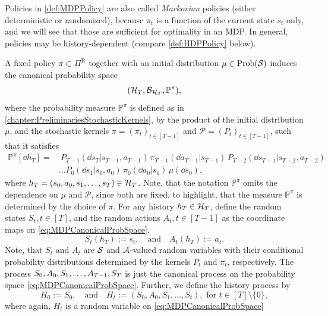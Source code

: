 \documentclass[
    a4paper,
    11pt,
    bibliography=totoc,
    listof=totoc,      
    headinclude=true,
    cleardoublepage=empty,
]{scrbook}
\theoremstyle{plain}
\theoremstyle{definition}
\theoremstyle{remark}
\newcommand{\PM}{\mathbb P}
\newcommand{\SpaceS}{{\cal S}}
\newcommand{\SpaceA}{{\cal A}}
\newcommand{\SpaceH}{{\cal H}}
\begin{document}
Policies in \cref{def:MDPPolicy} are also called \textit{Markovian}
policies (either deterministic or randomized), because $\pi_t$ is a function
of the current state $s_t$ only, and we will see that those are sufficient for 
optimality in an MDP. In general, policies may be history-dependent (compare  
\cref{def:HDPPolicy} below).

A fixed policy $\pi\subset \Pi^\text{R}$ together with an initial distribution
$\mu\in\text{Prob}(\SpaceS)$ induces the canonical probability space
\begin{equation}
\label{eq:MDPCanonicalProbSpace}
    (\SpaceH_T, \mathcal{B}_{\SpaceH_T}, \PM^\pi),
\end{equation}
where the probability measure $\PM^\pi$ is defined as in
\cref{chapter:PreliminariesStochasticKernels}, by the product of the initial 
distribution $\mu$, and the stochastic kernels $\pi = (\pi_t)_{t\in[T-1]}$  and 
$\mathcal{P} = (P_t)_{t\in[T-1]}$, such that it satisfies
\begin{equation}
\label{eq:MDPCanonicalMeasure}
\begin{split}
    \PM^\pi [\dd{h_T}] 
    = &\ P_{T-1}(\dd s_T | s_{T-1}, a_{T-1})\, \pi_{T-1}(\dd a_{T-1}|s_{T-1})\,
    P_{T-2}(\dd s_{T-1} | s_{T-2}, a_{T-2}) \\
    &\dots P_{0}(\dd s_1 | s_0, a_0)\, \pi_0(\dd a_0|s_0)\, \mu(\dd s_0),
\end{split}    
\end{equation}
where $h_T = (s_0, a_0, s_1,\dots,s_T)\in\SpaceH_T$. Note, that the notation 
$\PM^\pi$ omits the dependence on $\mu$ and $\mathcal{P}$, since 
both are fixed, to highlight, that the measure $\PM^\pi$ is determined by the 
choice of $\pi$.
% 
For any history $h_T \in \SpaceH_T$, define the random states $S_t, t\in[T]$, 
and the random actions $A_t,t\in[T-1]$ as the coordinate maps on
\eqref{eq:MDPCanonicalProbSpace},
\[
    S_t(h_T) := s_t, 
    \quad \text{and} \quad
    A_t(h_T) := a_t.
\]
Note, that $S_t$ and $A_t$ are $\SpaceS$ and $\SpaceA$-valued random variables
with their conditional probability distributions determined by the kernels 
$P_t$ and $\pi_t$, respectively. The process $S_0, A_0, S_1, \dots, \\ A_{T-1}, S_T$ 
is just the canonical process on the probability space 
\eqref{eq:MDPCanonicalProbSpace}. Further, we define the history process by
\[
    H_0 := S_0, 
    \quad \text{and} \quad
    H_t := (S_0,A_0,S_1,\dots,S_t), \text{ for } t\in[T]\setminus\{0\},
\]
where again, $H_t$ is a random variable on \eqref{eq:MDPCanonicalProbSpace}
\end{document}
